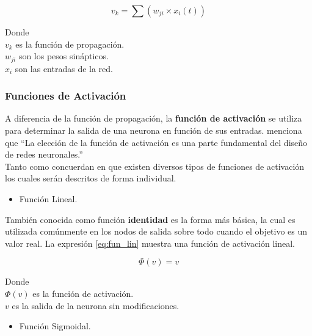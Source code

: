    \begin{equation}
        v_k = \sum(w_{ji}\times x_i(t))
        \label{eq:func_prop}
    \end{equation}

    Donde\\
    \noindent
    $v_k$ es la función de propagación.\\
    $w_{ji}$ son los pesos sinápticos.\\
    $x_{i}$ son las entradas de la red.\\

    \subsubsection{Funciones de Activación}

    A diferencia de la función de propagación, la \textbf{función de activación} se utiliza para determinar la salida de una neurona en función de sus entradas. \citet[p. 25]{bib18} menciona que ``La elección de la función de activación es una parte fundamental del diseño de redes neuronales.''\\

    Tanto \citep[p. 12]{bib13} como \citep[p. 26]{bib18} concuerdan en que existen diversos tipos de funciones de activación los cuales serán descritos de forma individual.

    \begin{itemize}
        \item Función Lineal.
    \end{itemize}

    También conocida como función \textbf{identidad} es la forma más básica, la cual es utilizada comúnmente en los nodos de salida sobre todo cuando el objetivo es un valor real. La expresión \ref{eq:fun_lin} muestra una función de activación lineal.

    \begin{equation}
        \Phi(v) = v
        \label{eq:fun_lin}
    \end{equation}

    Donde\\
    \noindent
    $\Phi(v)$ es la función de activación.\\
    $v$ es la salida de la neurona sin modificaciones.

    \begin{itemize}
        \item Función Sigmoidal.
    \end{itemize}

